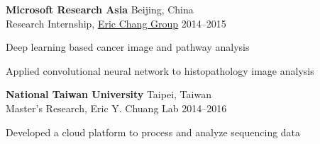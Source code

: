 \begin{entrylist}
\item \textbf{Microsoft Research Asia} \hfill Beijing, China\\
Research Internship, \href{https://www.microsoft.com/en-us/research/people/echang/}{Eric Chang Group} \hfill
2014--2015
\begin{detaillist}
    \item Deep learning based cancer image and pathway analysis
    \item Applied convolutional neural network to histopathology image analysis
\end{detaillist}

\item \textbf{National Taiwan University} \hfill Taipei, Taiwan\\
Master's Research, Eric Y. Chuang Lab \hfill
2014--2016
\begin{detaillist}
    \item Developed a cloud platform to process and analyze sequencing data
\end{detaillist}

\end{entrylist}
